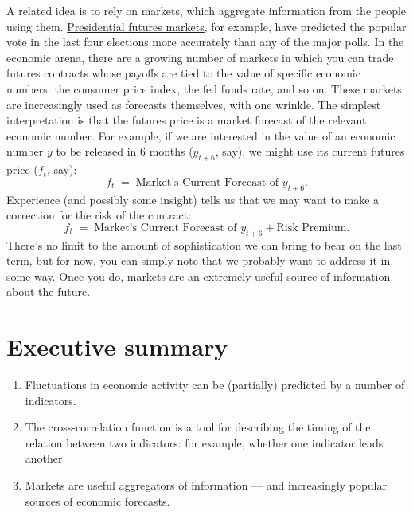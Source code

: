 A related idea is to rely on markets, which aggregate information
from the people using them.  \href{http://tippie.uiowa.edu/iem/markets/pres12.html}{Presidential futures markets}, for
example, have predicted the popular vote in the last four
elections more accurately than any of the major polls. 
In the economic arena, there are a growing number of markets
in which you can trade futures contracts whose payoffs are tied
to the value of specific economic numbers:
the consumer price index, the fed funds rate, and so on.
These markets are increasingly used as forecasts themselves, with one wrinkle.
The simplest interpretation is that the futures price is a market forecast
of the relevant economic number.
For example, if we are interested in the value of an economic number $y$
to be released in 6 months ($y_{t+6}$, say),
we might use its current futures price ($f_t$, say):
\[
    f_t  \;=\;  \mbox{Market's Current Forecast of } y_{t+6} .
\]
Experience (and possibly some insight) tells us that we may want to make a
correction for the risk of the contract:
\[
    f_t  \;=\;  \mbox{Market's Current Forecast of } y_{t+6}
                + \mbox{Risk Premium} .
\]
There's no limit to the amount of sophistication
we can bring to bear on the last term,
but for now, you can simply note that
we probably want to address it in some way.
Once you do, markets are an extremely useful source of information
about the future.


\section*{Executive summary}

\begin{enumerate}
\item Fluctuations in economic activity can be (partially)
predicted by a number of indicators.

\item The cross-correlation function is a tool for describing the
timing of the relation between two indicators:
for example, whether one indicator leads another.

\item Markets are useful aggregators of information --- and increasingly popular sources of economic forecasts.
\end{enumerate}


